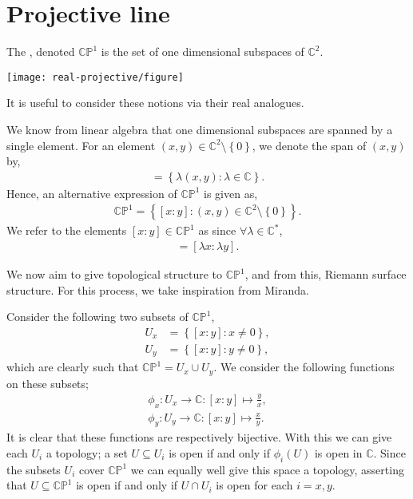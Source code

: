 \section{Projective line}
\begin{definition}
	The , denoted $ \mathbb{C}\mathbb{P}^{1} $ is
	the set of one dimensional subspaces of $ \mathbb{C}^{2} $.
\end{definition}

\begin{marginfigure}[-3\baselineskip]
	\centering
	\texttt{[image: real-projective/figure]}
	\caption{It is useful to consider these notions via their real analogues.}
\end{marginfigure}

We know from linear algebra that one dimensional subspaces are spanned by a
single element. For an element $ (x,y) \in \mathbb{C}^{2}\setminus \left\{ 0
	\right\} $, we denote the span of $ (x,y) $ by,
\begin{align*}
	[x:y] = \left\{ \lambda(x,y): \lambda \in \mathbb{C} \right\}.
\end{align*}
Hence, an alternative expression of $ \mathbb{C}\mathbb{P}^{1} $ is given as,
\begin{align*}
	\mathbb{C}\mathbb{P}^{1} = \left\{ [x:y]:(x,y) \in \mathbb{C}^{2}\setminus
	\left\{ 0 \right\} \right\}.
\end{align*}
We refer to the elements $ [x:y] \in \mathbb{C}\mathbb{P}^{1} $ as
 since $ \forall \lambda \in
	\mathbb{C}^{*} $,
\begin{align*}
	[x:y] = [\lambda x: \lambda y].
\end{align*}

We now aim to give topological structure to $ \mathbb{C}\mathbb{P}^{1} $, and
from this, Riemann surface structure. For this process, we take inspiration from
Miranda.

Consider the following two subsets of $ \mathbb{C}\mathbb{P}^{1} $,
\begin{align*}
	U_x & = \left\{ [x:y] : x \neq 0 \right\}, \\
	U_y & = \left\{ [x:y] : y \neq 0 \right\},
\end{align*}
which are clearly such that $ \mathbb{C}\mathbb{P}^{1} = U_x \cup U_y $. We
consider the following functions on these subsets;
\begin{align*}
	\phi_x: U_x \to \mathbb{C}: [x:y] \mapsto \frac{y}{x}, \\
	\phi_y: U_y \to \mathbb{C}: [x:y] \mapsto \frac{x}{y}.
\end{align*}
It is clear that these functions are respectively bijective. With this we can
give each $ U_i $ a topology; a set $ U \subseteq U_i $ is open if and only if $
	\phi_i(U) $ is open in $ \mathbb{C} $. Since the subsets $ U_i $ cover $
	\mathbb{C}\mathbb{P}^{1} $ we can equally well give this space a topology,
asserting that $ U \subseteq \mathbb{C}\mathbb{P}^{1} $ is open if and only if $
	U \cap U_i $ is open for each $ i=x,y $.

